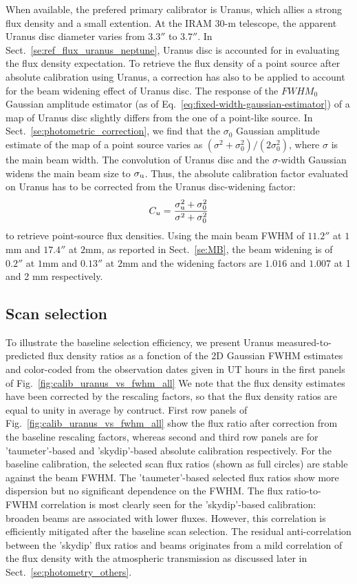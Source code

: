  When available, the prefered primary calibrator is Uranus,
 which allies a strong flux density and a small extention. At the IRAM
 $30$-m telescope, the apparent Uranus disc diameter varies from
 $3.3''$ to $3.7''$. In Sect.~\ref{se:ref_flux_uranus_neptune}, Uranus
 disc is accounted for in evaluating the flux density
 expectation. To retrieve the
 flux density of a point source after absolute calibration using
 Uranus, a correction has also to be applied to account for the
 beam widening effect of Uranus disc. The response of the $FWHM_0$
 Gaussian amplitude estimator (as of
 Eq.~\ref{eq:fixed-width-gaussian-estimator})
 of a map of Uranus disc
 slightly differs from the one of a point-like source. In
 Sect.~\ref{se:photometric_correction}, we find that the $\sigma_0$
 Gaussian amplitude estimate
 of the map of a point source varies as
 $(\sigma^2 + \sigma_0^2)/(2\sigma_0^2)$, where $\sigma$ is the main
 beam width. The convolution of Uranus disc and the $\sigma$-width
 Gaussian widens the main beam size to $\sigma_{\rm{u}}$. Thus, the
 absolute calibration factor evaluated on Uranus has to be corrected
 from the Uranus disc-widening factor:
 \begin{equation}
   C_{u} = \frac{\sigma_{\rm{u}}^2 + \sigma_0^2}{\sigma^2 + \sigma_0^2} 
\end{equation}
to retrieve point-source flux densities. Using the main beam FWHM of
$11.2''$ at $1$mm and $17.4''$ at $2$mm, as reported in Sect.~\ref{se:MB},
the beam widening is of $0.2''$ at $1$mm and $0.13''$ at $2$mm and the
widening factors are $1.016$ and $1.007$ at 1 and 2 mm respectively.

 



\subsection{Scan selection}

To illustrate the baseline selection efficiency, we present Uranus
measured-to-predicted flux density ratios as a fonction of the 2D
Gaussian FWHM estimates and color-coded from the observation dates
given in UT hours in the first panels of
Fig.~\ref{fig:calib_uranus_vs_fwhm_all}
We note that the flux density estimates have been corrected by the
rescaling factors, so that the flux density ratios are equal to unity
in average by contruct. First row panels of
Fig.~\ref{fig:calib_uranus_vs_fwhm_all} show the flux ratio after
correction from the baseline rescaling factors, whereas second and
third row panels are for 'taumeter'-based and 'skydip'-based absolute
calibration respectively. For the baseline calibration, the selected
scan flux ratios (shown as full circles) are stable against the beam
FWHM. The 'taumeter'-based selected flux ratios show more dispersion
but no significant dependence on the FWHM. The flux ratio-to-FWHM
correlation is most clearly seen for the 'skydip'-based calibration:
broaden beams are associated with lower fluxes. However, this
correlation is efficiently mitigated after the baseline scan
selection. The residual anti-correlation between
the 'skydip' flux ratios and beams originates from a mild
correlation of the flux density with the atmospheric transmission as
discussed later in Sect.~\ref{se:photometry_others}. 

